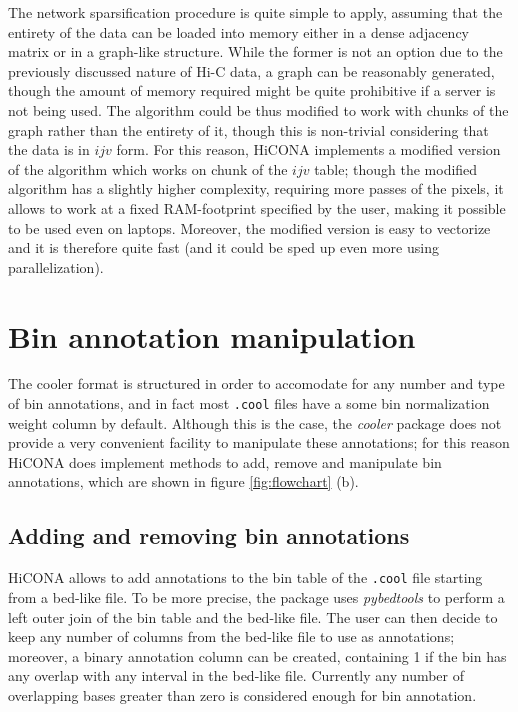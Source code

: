 The network sparsification procedure is quite simple to apply, assuming that the entirety of the data can be loaded into memory either in a dense adjacency matrix or in a graph-like structure. While the former is not an option due to the previously discussed nature of Hi-C data, a graph can be reasonably generated, though the amount of memory required might be quite prohibitive if a server is not being used. The algorithm could be thus modified to work with chunks of the graph rather than the entirety of it, though this is non-trivial considering that the data is in $ijv$ form. For this reason, HiCONA implements a modified version of the algorithm which works on chunk of the $ijv$ table; though the modified algorithm has a slightly higher complexity, requiring more passes of the pixels, it allows to work at a fixed RAM-footprint specified by the user, making it possible to be used even on laptops. Moreover, the modified version is easy to vectorize and it is therefore quite fast (and it could be sped up even more using parallelization).

\section{Bin annotation manipulation}

The cooler format is structured in order to accomodate for any number and type of bin annotations, and in fact most \texttt{.cool} files have a some bin normalization weight column by default. Although this is the case, the \emph{cooler} package does not provide a very convenient facility to manipulate these annotations; for this reason HiCONA does implement methods to add, remove and manipulate bin annotations, which are shown in figure \ref{fig:flowchart} (b). 

\subsection{Adding and removing bin annotations}

HiCONA allows to add annotations to the bin table of the \texttt{.cool} file starting from a bed-like file. To be more precise, the package uses \emph{pybedtools} to perform a left outer join of the bin table and the bed-like file. The user can then decide to keep any number of columns from the bed-like file to use as annotations; moreover, a binary annotation column can be created, containing 1 if the bin has any overlap with any interval in the bed-like file. Currently any number of overlapping bases greater than zero is considered enough for bin annotation.

